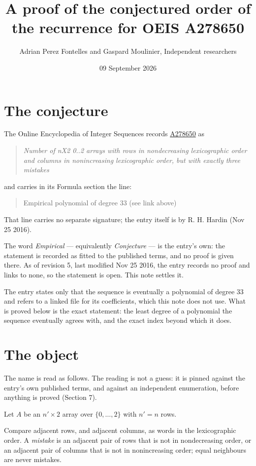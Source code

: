 \documentclass[11pt]{article}
\title{A proof of the conjectured order of the recurrence for OEIS A278650}
\author{Adrian Perez Fontelles and Gaspard Moulinier, Independent researchers}
\date{09 September 2026}
\theoremstyle{definition}
\begin{document}
\maketitle
\section{The conjecture}

The Online Encyclopedia of Integer Sequences records \href{https://oeis.org/A278650}{A278650} as

\begin{quote}\itshape Number of nX2 0..2 arrays with rows in nondecreasing lexicographic order and columns in nonincreasing lexicographic order, but with exactly three mistakes\end{quote}

and carries in its Formula section the line:

\begin{quote}\ttfamily Empirical polynomial of degree 33 (see link above)\end{quote}

That line carries no separate signature; the entry itself is by R. H. Hardin (Nov 25 2016).

The word {\itshape Empirical} --- equivalently {\itshape Conjecture} --- is the entry's own: the statement is recorded as fitted to the published terms, and no proof is given there. As of revision 5, last modified Nov 25 2016, the entry records no proof and links to none, so the statement is open. This note settles it.

The entry states only that the sequence is eventually a polynomial of degree $33$ and refers to a linked file for its coefficients, which this note does not use. What is proved below is the exact statement: the least degree of a polynomial the sequence eventually agrees with, and the exact index beyond which it does.

\section{The object}

The name is read as follows. The reading is not a guess: it is pinned against the entry's own published terms, and against an independent enumeration, before anything is proved (Section 7).

Let $A$ be an $n' \times 2$ array over $\{0,\dots,2\}$ with $n' = n$ rows.

Compare adjacent rows, and adjacent columns, as words in the lexicographic order. A {\itshape mistake} is an adjacent pair of rows that is not in nondecreasing order, or an adjacent pair of columns that is not in nonincreasing order; equal neighbours are never mistakes.
\end{document}
